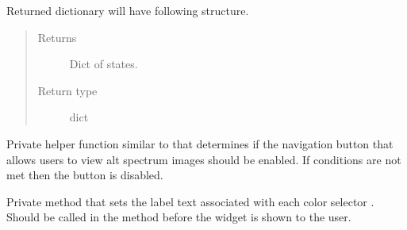 \documentclass[letterpaper,10pt,english]{sphinxmanual}
\begin{document}
\begin{fulllineitems}
\begin{fulllineitems}
Returned dictionary will have following structure.

\begin{sphinxVerbatim}[commandchars=\\\{\}]
 
 
 
 
\end{sphinxVerbatim}
\begin{quote}\begin{description}
\item[{Returns}] \leavevmode
Dict of  states.

\item[{Return type}] \leavevmode
dict

\end{description}\end{quote}

\end{fulllineitems}


\begin{fulllineitems}
\label{\detokenize{polo.widgets:polo.widgets.plate_inspector_widget.PlateInspectorWidget._set_alt_spectrum_buttons}}
Private helper function similar to 
that determines if the navigation button that allows users to view 
alt spectrum images should be enabled. If conditions are not met then 
the button is disabled.

\end{fulllineitems}


\begin{fulllineitems}
\label{\detokenize{polo.widgets:polo.widgets.plate_inspector_widget.PlateInspectorWidget._set_color_comboboxs}}
Private method that sets the label text associated with each color
selector . Should be called in the  method before
the widget is shown to the user.


\end{fulllineitems}
\end{fulllineitems}
\end{document}
